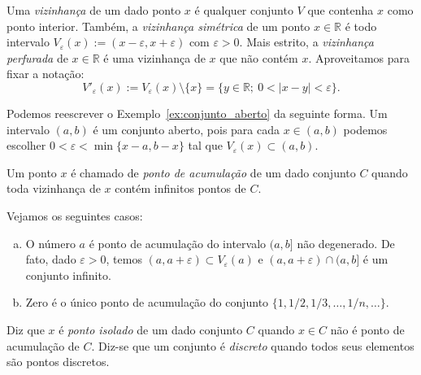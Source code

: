 \begin{defn}
  Uma \emph{vizinhança} de um dado ponto $x$ é qualquer conjunto $V$ que contenha $x$ como ponto interior. Também, a \emph{vizinhança simétrica} de um ponto $x\in\mathbb{R}$ é todo intervalo $V_\varepsilon(x) := (x-\varepsilon, x+\varepsilon)$ com $\varepsilon>0$. Mais estrito, a \emph{vizinhança perfurada} de $x\in\mathbb{R}$ é uma vizinhança de $x$ que não contém $x$. Aproveitamos para fixar a notação:
  \begin{equation*}
    V'_\varepsilon(x) := V_\varepsilon(x)\setminus \{x\} = \{y\in\mathbb{R};~0<|x-y|<\varepsilon\}.
  \end{equation*}
\end{defn}

\begin{ex}
  Podemos reescrever o Exemplo~\ref{ex:conjunto_aberto} da seguinte forma. Um intervalo $(a, b)$ é um conjunto aberto, pois para cada $x\in (a, b)$ podemos escolher $0<\varepsilon<\min\{x-a,b-x\}$ tal que $V_\varepsilon(x)\subset (a, b)$.
\end{ex}

\begin{defn}
  Um ponto $x$ é chamado de \emph{ponto de acumulação} de um dado conjunto $C$ quando toda vizinhança de $x$ contém infinitos pontos de $C$.
\end{defn}

\begin{ex}
  Vejamos os seguintes casos:
  \begin{enumerate}[a)]
  \item O número $a$ é ponto de acumulação do intervalo $(a, b]$ não degenerado. De fato, dado $\varepsilon>0$, temos $(a, a+\varepsilon)\subset V_\varepsilon(a)$ e $(a, a+\varepsilon)\cap (a, b]$ é um conjunto infinito.
  \item Zero é o único ponto de acumulação do conjunto $\{1, 1/2, 1/3, \dotsc, 1/n, \ldots\}$.
  \end{enumerate}
\end{ex}

\begin{defn}
  Diz que $x$ é \emph{ponto isolado} de um dado conjunto $C$ quando $x\in C$ não é ponto de acumulação de $C$. Diz-se que um conjunto é \emph{discreto} quando todos seus elementos são pontos discretos.
\end{defn}

